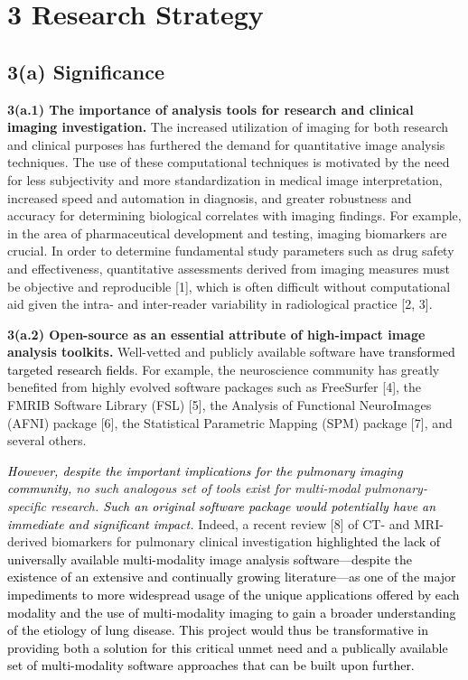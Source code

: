 \documentclass[11pt,]{article}
\begin{document}
\newpage

\section{3 Research Strategy}\label{research-strategy}

\subsection{\texorpdfstring{\textbf{3(a)
Significance}}{3(a) Significance}}\label{a-significance}

\textbf{3(a.1) The importance of analysis tools for research and
clinical \textcolor{black}{imaging} investigation.} The increased
utilization of imaging for both research and clinical purposes has
furthered the demand for quantitative image analysis techniques. The use
of these computational techniques is motivated by the need for less
subjectivity and more standardization in medical image interpretation,
increased speed and automation in diagnosis, and greater robustness and
accuracy for determining biological correlates with imaging findings.
For example, in the area of pharmaceutical development and testing,
imaging biomarkers are crucial. In order to determine fundamental study
parameters such as drug safety and effectiveness, quantitative
assessments derived from imaging measures must be objective and
reproducible {[}1{]}, which is often difficult without computational aid
given the intra- and inter-reader variability in radiological practice
{[}2, 3{]}.

\textbf{3(a.2) Open-source as an essential attribute of high-impact
image analysis toolkits.} Well-vetted and publicly available software
\textcolor{black}{have transformed targeted research fields}. For
example, the neuroscience community has greatly benefited from highly
evolved software packages such as FreeSurfer {[}4{]}, the FMRIB Software
Library (FSL) {[}5{]}, the Analysis of Functional NeuroImages (AFNI)
package {[}6{]}, the Statistical Parametric Mapping (SPM) package
{[}7{]}, and several others.

\emph{\textcolor{black}{However, despite the important implications for the pulmonary imaging
community}, no such analogous set of tools exist for multi-modal
pulmonary-specific research.
\textcolor{black}{Such an original software package would potentially have an immediate and
significant impact.}} Indeed, a recent review {[}8{]} of CT- and
MRI-derived biomarkers for pulmonary clinical investigation
\textcolor{black}{
highlighted the lack of universally available multi-modality image
analysis software---despite the existence of an extensive and continually
growing literature---as one of the major impediments to more widespread
usage of the unique applications offered by each modality and the use of
multi-modality imaging to gain a broader understanding of the etiology
of lung disease. This project would thus be transformative in providing
both a solution for this critical unmet need and a publically available
set of multi-modality software approaches that can be built upon further.}
\end{document}
